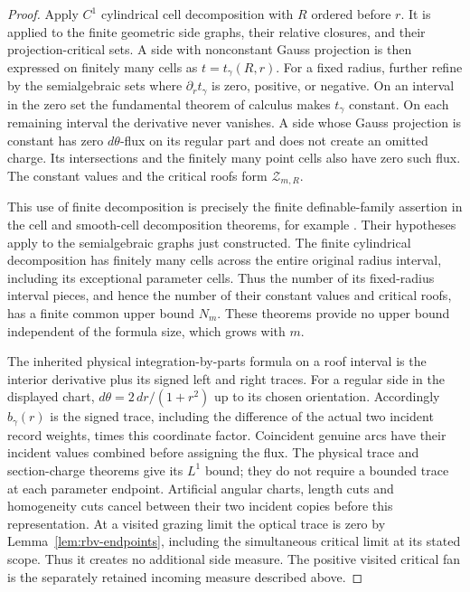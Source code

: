 \begin{proof}
Apply $C^1$ cylindrical cell decomposition with $R$ ordered
before $r$. It is applied to the finite geometric side graphs,
their relative closures, and their projection-critical sets.
A side with nonconstant Gauss projection is then expressed on
finitely many cells as $t=t_\gamma(R,r)$.
For a fixed radius, further refine by the semialgebraic sets
where $\partial_rt_\gamma$ is zero, positive, or negative.
On an interval in the zero set the fundamental theorem of
calculus makes $t_\gamma$ constant. On each remaining interval
the derivative never vanishes. A side whose Gauss projection
is constant has zero $d\theta$-flux on its regular part and
does not create an omitted charge. Its intersections and the
finitely many point cells also have zero such flux.
The constant values and the critical roofs form
$\mathcal Z_{m,R}$.

This use of finite decomposition is precisely the finite
definable-family assertion in the cell and smooth-cell
decomposition theorems, for example
\cite[Theorems 2.9--2.10 and 6.6--6.7]{CosteOM}.
Their hypotheses apply to the semialgebraic graphs just
constructed. The finite cylindrical decomposition has finitely
many cells across the entire original radius interval, including
its exceptional parameter cells. Thus the number of its
fixed-radius interval pieces, and hence the number of their
constant values and critical roofs, has a finite common upper
bound $N_m$. These theorems provide no upper bound independent
of the formula size, which grows with $m$.

The inherited physical integration-by-parts formula on a roof
interval is the interior derivative plus its signed left and
right traces. For a regular side in the displayed chart,
$d\theta=2\,dr/(1+r^2)$ up to its chosen orientation.
Accordingly $b_\gamma(r)$ is the signed trace, including the
difference of the actual two incident record weights, times
this coordinate factor. Coincident genuine arcs have their
incident values combined before assigning the flux.
The physical trace and section-charge theorems give its $L^1$
bound; they do not require a bounded trace at each parameter
endpoint. Artificial angular charts, length cuts and
homogeneity cuts cancel between their two incident copies
before this representation. At a visited grazing limit the
optical trace is zero by Lemma~\ref{lem:rbv-endpoints},
including the simultaneous critical limit at its stated scope.
Thus it creates no additional side measure. The positive
visited critical fan is the separately retained incoming
measure described above.


\end{proof}
